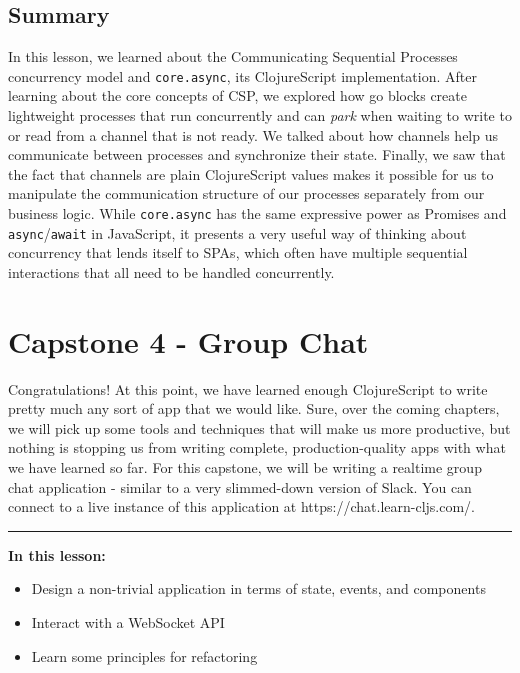 \documentclass[10pt,twoside,openright]{memoir}
\begin{document}
\section{Summary}

In this lesson, we learned about the Communicating Sequential Processes
concurrency model and \texttt{core.async}, its ClojureScript
implementation. After learning about the core concepts of CSP, we
explored how go blocks create lightweight processes that run
concurrently and can \emph{park} when waiting to write to or read from a
channel that is not ready. We talked about how channels help us
communicate between processes and synchronize their state. Finally, we
saw that the fact that channels are plain ClojureScript values makes it
possible for us to manipulate the communication structure of our
processes separately from our business logic. While \texttt{core.async}
has the same expressive power as Promises and
\texttt{async}/\texttt{await} in JavaScript, it presents a very useful
way of thinking about concurrency that lends itself to SPAs, which often
have multiple sequential interactions that all need to be handled
concurrently.

\chapter{Capstone 4 - Group Chat}

Congratulations! At this point, we have learned enough ClojureScript to
write pretty much any sort of app that we would like. Sure, over the
coming chapters, we will pick up some tools and techniques that will
make us more productive, but nothing is stopping us from writing
complete, production-quality apps with what we have learned so far. For
this capstone, we will be writing a realtime group chat application -
similar to a very slimmed-down version of Slack. You can connect to a
live instance of this application at https://chat.learn-cljs.com/.

\begin{center}\rule{0.5\linewidth}{0.5pt}\end{center}

\textbf{In this lesson:}

\begin{itemize}
\tightlist
\item
  Design a non-trivial application in terms of state, events, and
  components
\item
  Interact with a WebSocket API
\item
  Learn some principles for refactoring
\end{itemize}
\end{document}
